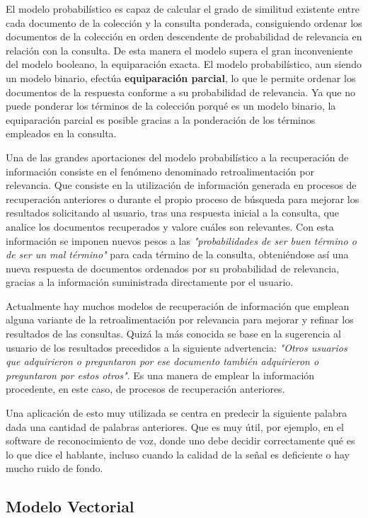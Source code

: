 \documentclass[titlepage]{article}
\begin{document}
El modelo probabilístico es capaz de calcular el grado de similitud existente entre cada documento de la colección y la consulta ponderada, consiguiendo ordenar los documentos de la colección en orden descendente de probabilidad de relevancia en relación con la consulta. De esta manera el modelo supera el gran inconveniente del modelo booleano, la equiparación exacta. El modelo probabilístico, aun siendo un modelo binario, efectúa \textbf{equiparación parcial}, lo que le permite ordenar los documentos de la respuesta conforme a su probabilidad de relevancia. Ya que no puede ponderar los términos de la colección porqué es un modelo binario, la equiparación parcial es posible gracias a la ponderación de los términos empleados en la consulta.

Una de las grandes aportaciones del modelo probabilístico a la recuperación de información consiste en el fenómeno denominado retroalimentación por relevancia. Que consiste en la utilización de información generada en procesos de recuperación anteriores o durante el propio proceso de búsqueda para mejorar los resultados solicitando al usuario, tras una respuesta inicial a la consulta, que analice los documentos recuperados y valore cuáles son relevantes. Con esta información se imponen nuevos pesos a las \textit{"probabilidades de ser buen término o de ser un mal término"} para cada término de la consulta, obteniéndose así una nueva respuesta de documentos ordenados por su probabilidad de relevancia, gracias a la información suministrada directamente por el usuario.

Actualmente hay muchos modelos de recuperación de información que emplean alguna variante de la retroalimentación por relevancia para mejorar y refinar los resultados de las consultas. Quizá la más conocida se base en la sugerencia al usuario de los resultados precedidos a la siguiente advertencia: \textit{"Otros usuarios que adquirieron o preguntaron por ese documento también adquirieron o preguntaron por estos otros"}. Es una manera de emplear la información procedente, en este caso, de procesos de recuperación anteriores.

Una aplicación de esto muy utilizada se centra en predecir la siguiente palabra dada una cantidad de palabras anteriores. Que es muy útil, por ejemplo, en el software de reconocimiento de voz, donde uno debe decidir correctamente qué es lo que dice el hablante, incluso cuando la calidad de la señal es deficiente o hay mucho ruido de fondo.

\subsection{Modelo Vectorial}
\end{document}
